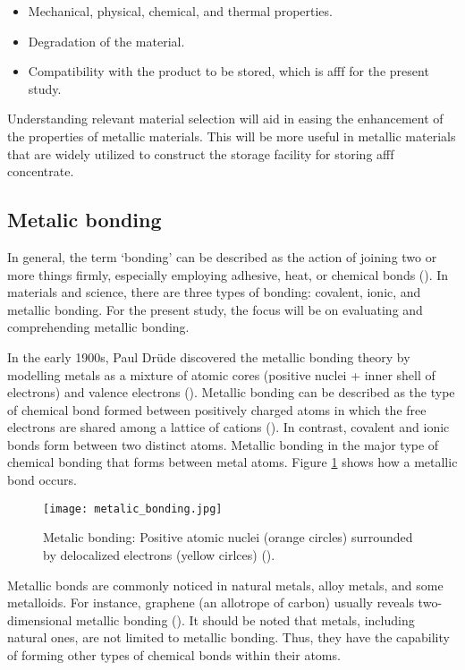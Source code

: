 \begin{itemize}
    \item Mechanical, physical, chemical, and thermal properties.
    \item Degradation of the material.
    \item Compatibility with the product to be stored, which is \acrshort{afff} for the present study.
\end{itemize}

Understanding relevant material selection will aid in easing the enhancement of the properties of metallic materials. This will be more useful in metallic materials that are widely utilized to construct the storage facility for storing \acrshort{afff} concentrate. 

\subsection{Metalic bonding}
In general, the term ‘bonding’ can be described as the action of joining two or more things firmly, especially employing adhesive, heat, or chemical bonds (\cite{soler2000metallic}). In materials and science, there are three types of bonding: covalent, ionic, and metallic bonding. For the present study, the focus will be on evaluating and comprehending metallic bonding.

In the early 1900s, Paul Drüde discovered the metallic bonding theory by modelling metals as a mixture of atomic cores (positive nuclei + inner shell of electrons) and valence electrons (\cite{sinex2017general}). Metallic bonding can be described as the type of chemical bond formed between positively charged atoms in which the free electrons are shared among a lattice of cations (\cite{lepetit2017topological}). In contrast, covalent and ionic bonds form between two distinct atoms. Metallic bonding in the major type of chemical bonding that forms between metal atoms. Figure \ref{ch3:figure:bonding} shows how a metallic bond occurs.

\begin{figure}[H]
    \centering
    \texttt{[image: metalic\_bonding.jpg]}
    \caption{Metalic bonding: Positive atomic nuclei (orange circles) surrounded by delocalized electrons (yellow cirlces) (\cite{soler2000metallic}).}
    \label{ch3:figure:bonding}
\end{figure}


Metallic bonds are commonly noticed in natural metals, alloy metals, and some metalloids. For instance, graphene (an allotrope of carbon) usually reveals two-dimensional metallic bonding (\cite{lepetit2017topological}). It should be noted that metals, including natural ones, are not limited to metallic bonding. Thus, they have the capability of forming other types of chemical bonds within their atoms.

